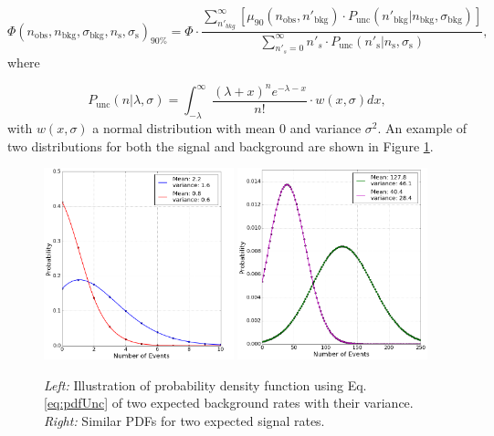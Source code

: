 \begin{equation}
\label{eq:finalUL}
\Phi(n_\textrm{obs}, n_\textrm{bkg}, \sigma_{\textrm{bkg}}, n_\textrm{s}, \sigma_{\textrm{s}} )_{90\%} = \Phi \cdot \frac{\sum^\infty_{n'_{bkg}} \left[ \mu_{90}\left(n_\textrm{obs},n'_\textrm{bkg} \right) \cdot P_\textrm{unc} \left(n'_\textrm{bkg}|n_\textrm{bkg},\sigma_{\textrm{bkg}}\right) \right]}{\sum^\infty_{n'_s = 0} n'_s \cdot P_\textrm{unc}\left(n'_\textrm{s} | n_\textrm{s}, \sigma_{\textrm{s}}\right)},
\end{equation}
where

\begin{equation}
\label{eq:pdfUnc}
P_\textrm{unc}\left(n|\lambda, \sigma \right) = \int^\infty_{-\lambda} \frac{\left(\lambda + x\right)^n e^{-\lambda-x}}{n!} \cdot w(x,\sigma)dx,
\end{equation}
with $w(x,\sigma)$ a normal distribution with mean 0 and variance $\sigma^2$. An example of two distributions for both the signal and background are shown in Figure \ref{fig:pvuncertaintieswidth}.

\begin{figure}
\centering
\includegraphics[width=0.49\textwidth]{chapter8/img/PVuncertainty_asweights_background.png}
\includegraphics[width=0.49\textwidth]{chapter8/img/PVuncertainty_asweights_signal.png}
\caption{\textit{Left: }Illustration of probability density function using Eq. \ref{eq:pdfUnc} of two expected background rates with their variance. \textit{Right: }Similar PDFs for two expected signal rates.}
\label{fig:pvuncertaintieswidth}
\end{figure}


